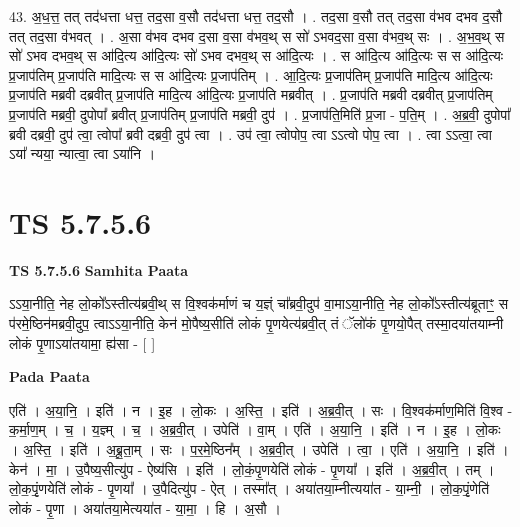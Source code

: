 \documentclass[17pt]{extarticle}
\begin{document}
43. अ॒ध॒त्त॒ तत् तद॑धत्ता धत्त॒ तद॒सा व॒सौ तद॑धत्ता धत्त॒ तद॒सौ । . तद॒सा व॒सौ तत् तद॒सा व॑भव दभव द॒सौ तत् तद॒सा व॑भवत् । . अ॒सा व॑भव दभव द॒सा व॒सा व॑भव॒थ् स सो॑ ऽभवद॒सा व॒सा व॑भव॒थ् सः । . अ॒भ॒व॒थ् स सो॑ ऽभव दभव॒थ् स आ॑दि॒त्य आ॑दि॒त्यः सो॑ ऽभव दभव॒थ् स आ॑दि॒त्यः । . स आ॑दि॒त्य आ॑दि॒त्यः स स आ॑दि॒त्यः प्र॒जाप॑तिम् प्र॒जाप॑ति मादि॒त्यः स स आ॑दि॒त्यः प्र॒जाप॑तिम् । . आ॒दि॒त्यः प्र॒जाप॑तिम् प्र॒जाप॑ति मादि॒त्य आ॑दि॒त्यः प्र॒जाप॑ति मब्रवी दब्रवीत् प्र॒जाप॑ति मादि॒त्य आ॑दि॒त्यः प्र॒जाप॑ति मब्रवीत् । . प्र॒जाप॑ति मब्रवी दब्रवीत् प्र॒जाप॑तिम् प्र॒जाप॑ति मब्रवी॒ दुपोपा᳚ ब्रवीत् प्र॒जाप॑तिम् प्र॒जाप॑ति मब्रवी॒ दुप॑ । . प्र॒जाप॑ति॒मिति॑ प्र॒जा - प॒ति॒म् । . अ॒ब्र॒वी॒ दुपोपा᳚ ब्रवी दब्रवी॒ दुप॑ त्वा॒ त्वोपा᳚ ब्रवी दब्रवी॒ दुप॑ त्वा । . उप॑ त्वा॒ त्वोपोप॒ त्वा ऽऽत्वो पोप॒ त्वा । . त्वा ऽऽत्वा॒ त्वा ऽया᳚ न्यया॒ न्यात्वा॒ त्वा ऽया॑नि । \newline
\pagebreak
{}

\section{ TS 5.7.5.6 }

\textbf{TS 5.7.5.6 } \newline
\textbf{Samhita Paata} \newline

ऽऽया॒नीति॒ नेह लो॒को᳚ऽस्तीत्य॑ब्रवी॒थ् स वि॒श्वक॑र्माणं च य॒ज्ञ्ं चा᳚ब्रवी॒दुप॑ वा॒माऽया॒नीति॒ नेह लो॒को᳚ऽस्तीत्य॑ब्रूताꣳ॒॒ स प॑रमे॒ष्ठिन॑मब्रवी॒दुप॒ त्वाऽऽया॒नीति॒ केन॑ मो॒पैष्य॒सीति॑ लोकं पृ॒णयेत्य॑ब्रवी॒त् तं ॅलो॑कं पृ॒णयो॒पैत् तस्मा॒दया॑तयाम्नी लोकं पृ॒णाऽया॑तयामा॒ ह्य॑सा - [  ] \newline

\textbf{Pada Paata} \newline

एति॑ । अ॒या॒नि॒ । इति॑ । न । इ॒ह । लो॒कः । अ॒स्ति॒ । इति॑ । अ॒ब्र॒वी॒त् । सः । वि॒श्वक॑र्माण॒मिति॑ वि॒श्व - क॒र्मा॒ण॒म् । च॒ । य॒ज्ञ्म् । च॒ । अ॒ब्र॒वी॒त् । उपेति॑ । वा॒म् । एति॑ । अ॒या॒नि॒ । इति॑ । न । इ॒ह । लो॒कः । अ॒स्ति॒ । इति॑ । अ॒ब्रू॒ता॒म् । सः । प॒र॒मे॒ष्ठिन᳚म् । अ॒ब्र॒वी॒त् । उपेति॑ । त्वा॒ । एति॑ । अ॒या॒नि॒ । इति॑ । केन॑ । मा॒ । उ॒पैष्य॒सीत्यु॑प - ऐष्य॑सि । इति॑ । लो॒कं॒पृ॒णयेति॑ लोकं - पृ॒णया᳚ । इति॑ । अ॒ब्र॒वी॒त् । तम् । लो॒क॒पृं॒णयेति॑ लोकं - पृ॒णया᳚ । उ॒पैदित्यु॑प - ऐत् । तस्मा᳚त् । अया॑तया॒म्नीत्यया॑त - या॒म्नी॒ । लो॒क॒पृं॒णेति॑ लोकं - पृ॒णा । अया॑तया॒मेत्यया॑त - या॒मा॒ । हि । अ॒सौ ।  \newline
\end{document}
